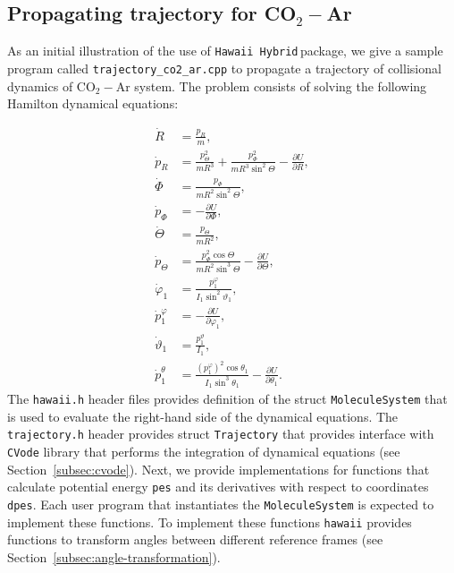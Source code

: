 \documentclass{article}
\newcommand{\lb}{\left(}
\newcommand{\rb}{\right)}
\newcommand{\libname}{\texttt{Hawaii Hybrid}\,}
\begin{document}
\subsection{Propagating trajectory for CO$_2-$Ar}
\label{subsec:example-trajectory}

As an initial illustration of the use of \libname package, we give a sample program called \texttt{trajectory\_co2\_ar.cpp} to propagate a trajectory of collisional dynamics of CO$_2-$Ar system. The problem consists of solving the following Hamilton dynamical equations:

\begin{align*}
    \dot{R} &= \frac{p_R}{m}, \\
    \dot{p}_R &= \frac{p_\Theta^2}{m R^3} + \frac{p_\Phi^2}{m R^3 \sin^2 \Theta} - \frac{\partial U}{\partial R}, \\
    \dot{\Phi} &= \frac{p_\Phi}{m R^2 \sin^2 \Theta}, \\
    \dot{p}_\Phi &= -\frac{\partial U}{\partial \Phi}, \\
    \dot{\Theta} &= \frac{p_\Theta}{m R^2}, \\
    \dot{p}_\Theta &= \frac{p_\Phi^2 \cos \Theta}{m R^2 \sin^3 \Theta} - \frac{\partial U}{\partial \Theta}, \\
    \dot{\varphi}_1 &= \frac{\displaystyle p_1^{\varphi}}{I_1 \sin^2 \vartheta_1}, \\
    \dot{p}_1^{\varphi} &= -\frac{\partial U}{\partial \varphi_1}, \\
    \dot{\vartheta}_1 &= \frac{p_1^\vartheta}{I_1}, \\ 
    \dot{p}_1^{\theta} &= \frac{\displaystyle \lb p_1^\varphi \rb^2 \cos \theta_1}{I_1 \sin^3 \theta_1} - \frac{\partial U}{\partial \theta_1}.
\end{align*}
%
The \texttt{hawaii.h} header files provides definition of the struct \texttt{MoleculeSystem} that is used to evaluate the right-hand side of the dynamical equations. The \texttt{trajectory.h} header provides struct \texttt{Trajectory} that provides interface with \texttt{CVode} library that performs the integration of dynamical equations (see Section~\ref{subsec:cvode}).
Next, we provide implementations for functions that calculate potential energy \texttt{pes} and its derivatives with respect to coordinates \texttt{dpes}. Each user program that instantiates the \texttt{MoleculeSystem} is expected to implement these functions. To implement these functions \texttt{hawaii} provides functions to transform angles between different reference frames (see Section~\ref{subsec:angle-transformation}).      
\end{document}
